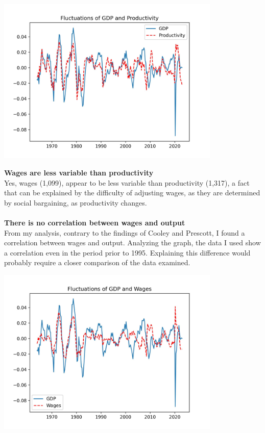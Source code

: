 \documentclass[12pt]{article}
\begin{document}
\begin{center}
\includegraphics[width=0.8\textwidth]{productivity_gdp.jpg}
\end{center}
\textbf{Wages are less variable than productivity}\\
Yes, wages (1,099), appear to be less variable than productivity (1,317), a fact that can be explained by the difficulty of adjusting wages, as they are determined by social bargaining, as productivity changes.\\\\
\textbf{There is no correlation between wages and output}\\
From my analysis, contrary to the findings of Cooley and Prescott, I found a correlation between wages and output. Analyzing the graph, the data I used show a correlation even in the period prior to 1995. Explaining this difference would probably require a closer comparison of the data examined. 

\begin{center}
\includegraphics[width=0.8\textwidth]{wages_gdp.jpg}
\end{center}
\end{document}
